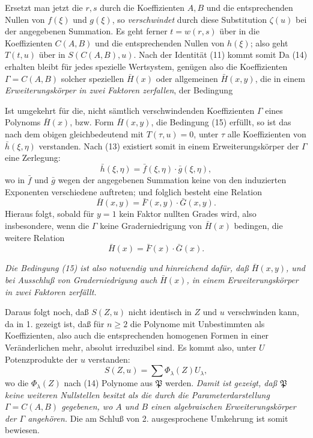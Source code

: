 Ersetzt man jetzt die $r,s$ durch die Koeffizienten $A,B$ und die entsprechenden Nullen von $f(\xi)$ und $g(\xi)$, so \emph{verschwindet} durch diese Substitution $\zeta(u)$ bei der angegebenen Summation. Es geht ferner $t=w(r,s)$ über in die Koeffizienten $C(A,B)$ und die entsprechenden Nullen von $h(\xi)$; also geht $T(t,u)$ über in $S(C(A,B),u)$. Nach der Identität (11) kommt somit
Da (14) erhalten bleibt für jedes spezielle Wertsystem, genügen also die Koeffizienten $\Gamma=C(A,B)$ solcher speziellen $\bar H(x)$ oder allgemeinen $\bar H(x,y)$, die in einem \emph{Erweiterungskörper in zwei Faktoren zerfallen}, der Bedingung

Ist umgekehrt für die, nicht sämtlich verschwindenden Koeffizienten $\Gamma$ eines Polynoms $\bar H(x)$, bzw. Form $\bar H(x,y)$, die Bedingung (15) erfüllt, so ist das nach dem obigen gleichbedeutend mit $T(\tau,u)=0$, unter $\tau$ alle Koeffizienten von $\bar h(\xi,\eta)$ verstanden. Nach (13) existiert somit in einem Erweiterungskörper der $\Gamma$ eine Zerlegung:
\[
 \bar h(\xi,\eta)=\bar f(\xi,\eta)\cdot\bar g(\xi,\eta),
\]
wo in $\bar f$ und $\bar g$ wegen der angegebenen Summation keine von den induzierten Exponenten verschiedene auftreten; und folglich besteht eine Relation
\[
 \bar H(x,y)=\bar F(x,y)\cdot\bar G(x,y).
\]
Hieraus folgt, sobald für $y=1$ kein Faktor nullten Grades wird, also insbesondere, wenn die $\Gamma$ keine Graderniedrigung von $\bar H(x)$ bedingen, die weitere Relation
\[
 \bar H(x)=\bar F(x)\cdot\bar G(x).
\]

\emph{Die Bedingung (15) ist also notwendig und hinreichend dafür, daß $\bar H(x,y)$, und bei Ausschluß von Graderniedrigung auch $\bar H(x)$, in einem Erweiterungskörper in zwei Faktoren zerfällt.}

Daraus folgt noch, daß $S(Z,u)$ nicht identisch in $Z$ und $u$ verschwinden kann, da in 1. gezeigt ist, daß für $n\ge2$ die Polynome mit Unbestimmten als Koeffizienten, also auch die entsprechenden homogenen Formen in einer Veränderlichen mehr, absolut irreduzibel sind. Es kommt also, unter $U$ Potenzprodukte der $u$ verstanden:
\[
S(Z,u)=\sum \Phi_\lambda(Z)U_\lambda,
\]
wo die $\Phi_\lambda(Z)$ nach (14) Polynome aus $\mathfrak P$ werden. \emph{Damit ist gezeigt, daß $\mathfrak P$ keine weiteren Nullstellen besitzt als die durch die Parameterdarstellung $\Gamma=C(A,B)$ gegebenen, wo $A$ und $B$ einen algebraischen Erweiterungskörper der $\Gamma$ angehören.} Die am Schluß von 2. ausgesprochene Umkehrung ist somit bewiesen.

